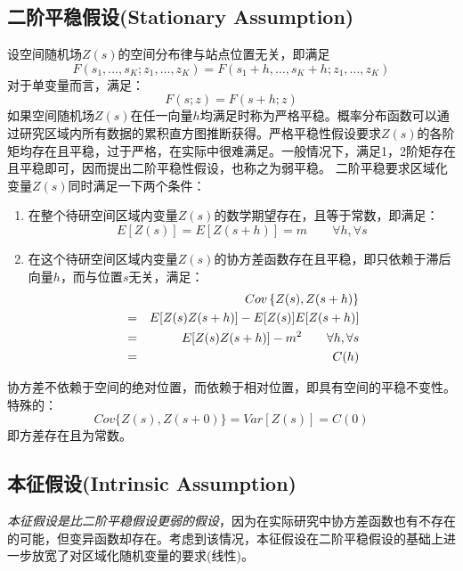 \subsection{二阶平稳假设(Stationary Assumption)}
设空间随机场$Z(s)$的空间分布律与站点位置无关，即满足
\begin{equation}
    F(s_1,\dots,s_K;z_1,\dots,z_K) = F(s_1+h,\dots,s_K+h;z_1,\dots,z_K)
    \label{eq-staionary1}
\end{equation}
对于单变量而言，满足：
\begin{equation}
    F(s;z) = F(s+h;z)
    \label{eq-staionary2}
\end{equation}
如果空间随机场$Z(s)$在任一向量$h$均满足时称为严格平稳。\textcolor[rgb]{1,0,0}{概率分布函数可以通过研究区域内所有数据的累积直方图推断获得}。严格平稳性假设要求$Z(s)$的各阶矩均存在且平稳，过于严格，在实际中很难满足。一般情况下，满足1，2阶矩存在且平稳即可，因而提出二阶平稳性假设，也称之为\textcolor[rgb]{1,0,0}{弱平稳}。
二阶平稳要求区域化变量$Z(s)$同时满足一下两个条件：
\begin{enumerate}
    \item 在整个待研空间区域内变量$Z(s)$的数学期望存在，且等于常数，即满足：
        \begin{equation}
            E[Z(s)] = E[Z(s+h)] = m \qquad \forall h, \forall s
            \label{eq-stationarycondition1}
        \end{equation}
    \item 在这个待研空间区域内变量$Z(s)$的协方差函数存在且平稳，即只依赖于滞后向量$h$，而与位置$s$无关，满足：
        \begin{eqnarray}
            &&Cov\left\{ Z(s),Z(s+h) \right\} \notag \\
            &=& E[Z(s)Z(s+h)] - E[Z(s)]E[Z(s+h)] \notag \\
            &=& E[Z(s)Z(s+h)]-m^2 \qquad \forall h,\forall s \\
            &=& C(h) \notag
            \label{eq-stationarycondition2}
        \end{eqnarray}
\end{enumerate}

\textcolor[rgb]{1,0,0}{协方差不依赖于空间的绝对位置，而依赖于相对位置，即具有空间的平稳不变性}。特殊的：
\begin{equation}
    Cov\{ Z(s),Z(s+0) \} = Var[Z(s)] = C(0)
    \label{eq-h0cov}
\end{equation}
即方差存在且为常数。


\subsection{本征假设(Intrinsic Assumption)}
\emph{\textcolor[rgb]{1,0,0}{本征假设是比二阶平稳假设更弱的假设}}，因为在实际研究中协方差函数也有不存在的可能，但变异函数却存在。考虑到该情况，本征假设在二阶平稳假设的基础上进一步放宽了对区域化随机变量的要求(线性)。

